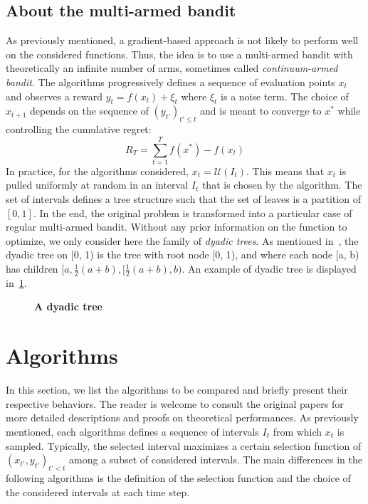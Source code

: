 \documentclass[a4paper,10pt]{article}
\begin{document}
\subsection{About the multi-armed bandit}
As previously mentioned, a gradient-based approach is not likely to perform well on the considered functions. Thus, the idea is to use a multi-armed bandit with theoretically an infinite number of arms, sometimes called \textit{continuum-armed bandit}. The algorithms progressively defines a sequence of evaluation points $x_t$ and observes a reward $y_t=f(x_t)+\xi_t$ where $\xi_t$ is a noise term. The choice of $x_{t+1}$ depends on the sequence of $(y_{t'})_{t'\le t}$ and is meant to converge to $x^*$ while controlling the cumulative regret:
\begin{equation}
\label{regret}
R_T = \underset{t=1}{\overset{T}{\sum}}f(x^*)-f(x_t)
\end{equation}
In practice, for the algorithms considered, $x_t = \mathcal{U}(I_t)$. This means that $x_t$ is pulled uniformly at random in an interval $I_t$ that is chosen by the algorithm. The set of intervals defines a tree structure such that the set of leaves is a partition of $[0,1]$. In the end, the original problem is transformed into a particular case of regular multi-armed bandit. Without any prior information on the function to optimize, we only consider here the family of \textit{dyadic trees}. As mentioned in~\cite{bull2013adaptive}, the dyadic tree on [0, 1) is the tree with root node [0, 1), and where each node [a, b) has children $[a, \frac{1}{2}(a+b), [ \frac{1}{2}(a+b), b)$. An example of dyadic tree is displayed in~\ref{dydtree}.

\begin{figure}
\label{dydtree}
\centering
\textbf{A dyadic tree}\\
\end{figure}



\section{Algorithms}
\label{algo}
In this section, we list the algorithms to be compared and briefly present their respective behaviors. The reader is welcome to consult the original papers for more detailed descriptions and proofs on theoretical performances. As previously mentioned, each algorithms defines a sequence of intervals $I_t$ from which $x_t$ is sampled. Typically, the selected interval maximizes a certain selection function of $(x_{t'},y_{t'})_{t'< t}$ among a subset of considered intervals. The main differences in the following algorithms is the definition of the selection function and the choice of the considered intervals at each time step.
\end{document}
